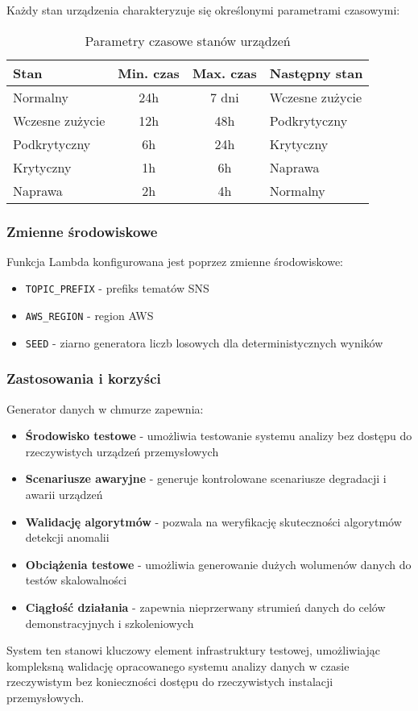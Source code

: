 Każdy stan urządzenia charakteryzuje się określonymi parametrami czasowymi:

\begin{table}[h]
\centering
\begin{tabular}{|l|c|c|l|}
\hline
\textbf{Stan} & \textbf{Min. czas} & \textbf{Max. czas} & \textbf{Następny stan} \\
\hline
Normalny & 24h & 7 dni & Wczesne zużycie \\
Wczesne zużycie & 12h & 48h & Podkrytyczny \\
Podkrytyczny & 6h & 24h & Krytyczny \\
Krytyczny & 1h & 6h & Naprawa \\
Naprawa & 2h & 4h & Normalny \\
\hline
\end{tabular}
\caption{Parametry czasowe stanów urządzeń}
\label{tab:parametry_stanow}
\end{table}

\subsubsection{Zmienne środowiskowe}
\label{subsec:zmienne_srodowiskowe}

Funkcja Lambda konfigurowana jest poprzez zmienne środowiskowe:

\begin{itemize}
    \item \texttt{TOPIC\_PREFIX} - prefiks tematów SNS
    \item \texttt{AWS\_REGION} - region AWS
    \item \texttt{SEED} - ziarno generatora liczb losowych dla deterministycznych wyników
\end{itemize}

\subsubsection{Zastosowania i korzyści}
\label{sec:zastosowania_korzysci}

Generator danych w chmurze zapewnia:

\begin{itemize}
    \item \textbf{Środowisko testowe} - umożliwia testowanie systemu analizy bez dostępu do rzeczywistych urządzeń przemysłowych
    \item \textbf{Scenariusze awaryjne} - generuje kontrolowane scenariusze degradacji i awarii urządzeń
    \item \textbf{Walidację algorytmów} - pozwala na weryfikację skuteczności algorytmów detekcji anomalii
    \item \textbf{Obciążenia testowe} - umożliwia generowanie dużych wolumenów danych do testów skalowalności
    \item \textbf{Ciągłość działania} - zapewnia nieprzerwany strumień danych do celów demonstracyjnych i szkoleniowych
\end{itemize}

System ten stanowi kluczowy element infrastruktury testowej, umożliwiając kompleksną walidację opracowanego systemu analizy danych w czasie rzeczywistym bez konieczności dostępu do rzeczywistych instalacji przemysłowych. 